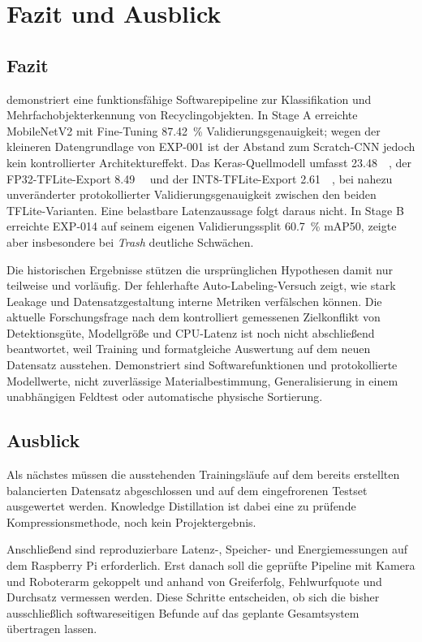 \section{Fazit und Ausblick}

\subsection{Fazit}
\mira demonstriert eine funktionsfähige Softwarepipeline zur Klassifikation und Mehrfachobjekterkennung von Recyclingobjekten. In Stage A erreichte MobileNetV2 mit Fine-Tuning \SI{87.42}{\percent} Validierungsgenauigkeit; wegen der kleineren Datengrundlage von EXP-001 ist der Abstand zum Scratch-CNN jedoch kein kontrollierter Architektureffekt. Das Keras-Quellmodell umfasst \SI{23.48}{\mebi\byte}, der FP32-TFLite-Export \SI{8.49}{\mebi\byte} und der INT8-TFLite-Export \SI{2.61}{\mebi\byte}, bei nahezu unveränderter protokollierter Validierungsgenauigkeit zwischen den beiden TFLite-Varianten. Eine belastbare Latenzaussage folgt daraus nicht. In Stage B erreichte EXP-014 auf seinem eigenen Validierungssplit \SI{60.7}{\percent} mAP50, zeigte aber insbesondere bei \textit{Trash} deutliche Schwächen.

Die historischen Ergebnisse stützen die ursprünglichen Hypothesen damit nur teilweise und vorläufig. Der fehlerhafte Auto-Labeling-Versuch zeigt, wie stark Leakage und Datensatzgestaltung interne Metriken verfälschen können. Die aktuelle Forschungsfrage nach dem kontrolliert gemessenen Zielkonflikt von Detektionsgüte, Modellgröße und CPU-Latenz ist noch nicht abschließend beantwortet, weil Training und formatgleiche Auswertung auf dem neuen Datensatz ausstehen. Demonstriert sind Softwarefunktionen und protokollierte Modellwerte, nicht zuverlässige Materialbestimmung, Generalisierung in einem unabhängigen Feldtest oder automatische physische Sortierung.

\subsection{Ausblick}
Als nächstes müssen die ausstehenden Trainingsläufe auf dem bereits erstellten balancierten Datensatz abgeschlossen und auf dem eingefrorenen Testset ausgewertet werden. Knowledge Distillation \cite{hinton2015distilling} ist dabei eine zu prüfende Kompressionsmethode, noch kein Projektergebnis.

Anschließend sind reproduzierbare Latenz-, Speicher- und Energiemessungen auf dem Raspberry Pi erforderlich. Erst danach soll die geprüfte Pipeline mit Kamera und Roboterarm gekoppelt und anhand von Greiferfolg, Fehlwurfquote und Durchsatz vermessen werden. Diese Schritte entscheiden, ob sich die bisher ausschließlich softwareseitigen Befunde auf das geplante Gesamtsystem übertragen lassen.
